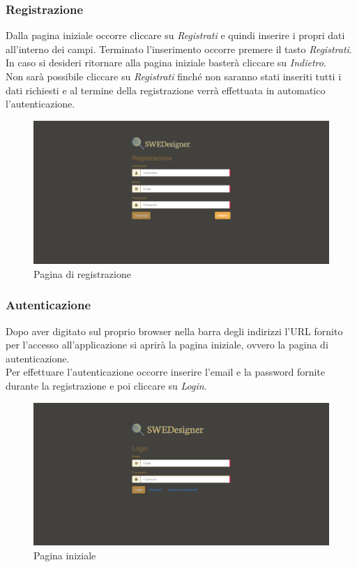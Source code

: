 \subsubsection{Registrazione}
Dalla pagina iniziale occorre cliccare su \textit{Registrati} e quindi inserire i propri dati all'interno dei campi. Terminato l'inserimento occorre premere il tasto \textit{Registrati}. In caso si desideri ritornare alla pagina iniziale basterà cliccare su \textit{Indietro}.\\
Non sarà possibile cliccare su \textit{Registrati} finché non saranno stati inseriti tutti i dati richiesti e al termine della registrazione verrà effettuata in automatico l'autenticazione.\\
\begin{figure}[H]
	\centering
		\includegraphics[width=1\linewidth]{res/img/registrazione.png}
	\caption{Pagina di registrazione}
\end{figure}
\newpage

\subsubsection{Autenticazione}
Dopo aver digitato sul proprio browser nella barra degli indirizzi l'URL fornito per l'accesso all'applicazione si aprirà la pagina iniziale, ovvero la pagina di autenticazione.\\
Per effettuare l'autenticazione occorre inserire l'email e la password fornite durante la registrazione e poi cliccare su \textit{Login}.\\
\begin{figure}[H]
	\centering
		\includegraphics[width=1\linewidth]{res/img/autenticazione.png}
	\caption{Pagina iniziale}
\end{figure}
\newpage

